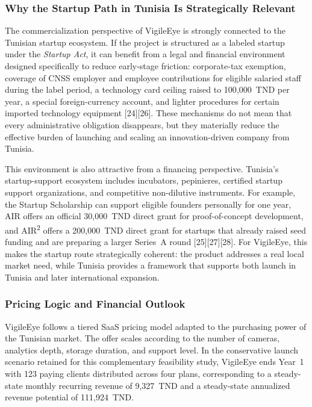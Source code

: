 \documentclass[12pt,a4paper,oneside]{report}
\begin{document}
\subsubsection{Why the Startup Path in Tunisia Is Strategically Relevant}
\hspace{0.8cm}The commercialization perspective of VigileEye is strongly connected to the Tunisian startup ecosystem. If the project is structured as a labeled startup under the \textit{Startup Act}, it can benefit from a legal and financial environment designed specifically to reduce early-stage friction: corporate-tax exemption, coverage of CNSS employer and employee contributions for eligible salaried staff during the label period, a technology card ceiling raised to 100{,}000~TND per year, a special foreign-currency account, and lighter procedures for certain imported technology equipment [24][26]. These mechanisms do not mean that every administrative obligation disappears, but they materially reduce the effective burden of launching and scaling an innovation-driven company from Tunisia.

\hspace{0.8cm}This environment is also attractive from a financing perspective. Tunisia's startup-support ecosystem includes incubators, pepinieres, certified startup support organizations, and competitive non-dilutive instruments. For example, the Startup Scholarship can support eligible founders personally for one year, AIR offers an official 30{,}000~TND direct grant for proof-of-concept development, and AIR\textsuperscript{2} offers a 200{,}000~TND direct grant for startups that already raised seed funding and are preparing a larger Series~A round [25][27][28]. For VigileEye, this makes the startup route strategically coherent: the product addresses a real local market need, while Tunisia provides a framework that supports both launch in Tunisia and later international expansion.

\subsubsection{Pricing Logic and Financial Outlook}
\hspace{0.8cm}VigileEye follows a tiered SaaS pricing model adapted to the purchasing power of the Tunisian market. The offer scales according to the number of cameras, analytics depth, storage duration, and support level. In the conservative launch scenario retained for this complementary feasibility study, VigileEye ends Year~1 with 123 paying clients distributed across four plans, corresponding to a steady-state monthly recurring revenue of 9{,}327~TND and a steady-state annualized revenue potential of 111{,}924~TND.
\end{document}
